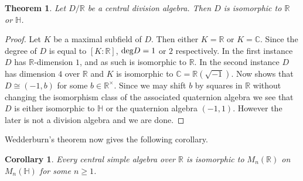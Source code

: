 \documentclass[11pt]{amsart}
\numberwithin{equation}{section}
\newtheorem{theorem}[equation]{Theorem}
\newtheorem{cor}[equation]{Corollary}
\theoremstyle{remark}
\theoremstyle{remark}
\theoremstyle{remark}
\theoremstyle{definition}
\theoremstyle{definition}
\theoremstyle{definition}
\theoremstyle{definition}
\theoremstyle{definition}
\theoremstyle{definition}
\begin{document}
\begin{theorem} \label{division algebras over the reals}
Let $D/\mathbb{R}$ be a central division algebra. Then $D$ is isomorphic to $\mathbb{R}$ or $\mathbb{H}$.
\end{theorem}

\begin{proof}
Let $K$ be a maximal subfield of $D$. Then either $K=\mathbb{R}$ or $K=\mathbb{C}$. Since the degree of $D$ is equal to $[K:\mathbb{R}]$, $\textup{deg}D=1$ or $2$ respectively. In the first instance $D$ has $\mathbb{R}$-dimension $1$, and as such is isomorphic to $\mathbb{R}$. In the second instance $D$ has dimension $4$ over $\mathbb{R}$ and $K$ is isomorphic to $\mathbb{C}=\mathbb{R}(\sqrt{-1})$. Now   shows that $D\cong (-1,b)$ for some $b\in \mathbb{R}^{\times}$. Since we may shift $b$ by squares in $\mathbb{R}$ without changing the isomorphism class of the associated quaternion algebra we see that $D$ is either isomorphic to $\mathbb{H}$ or the quaternion algebra $(-1,1)$. However the later is not a division algebra and we are done.
%
\end{proof}

Wedderburn's theorem now gives the following corollary. 

\begin{cor}
Every central simple algebra over $\mathbb{R}$ is isomorphic to $M_n(\mathbb{R})$ on $M_n(\mathbb{H})$ for some $n\geq 1$.
\end{cor}
\end{document}
